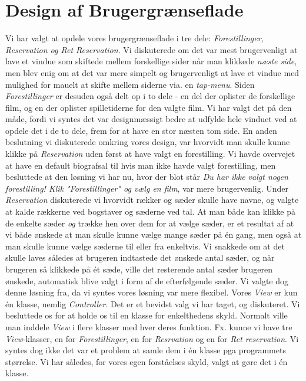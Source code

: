 \documentclass[final]{report}
\begin{document}
\section{Design af Brugergrænseflade}
Vi har valgt at opdele vores brugergrænseflade i tre dele: \emph{Forestillinger, Reservation og Ret Reservation}. Vi diskuterede om det var mest brugervenligt at lave et vindue som skiftede mellem forskellige sider når man klikkede \emph{næste side}, men blev enig om at det var mere simpelt og brugervenligt at lave et vindue med mulighed for mauelt at skifte mellem siderne via. en \emph{tap-menu}. Siden \emph{Forestillinger} er desuden også delt op i to dele - en del der oplister de forskellige film, og en der oplister spilletiderne for den valgte film. Vi har valgt det på den måde, fordi vi syntes det var designmæssigt bedre at udfylde hele vinduet ved at opdele det i de to dele, frem for at have en stor næsten tom side. 
En anden beslutning vi diskuterede omkring vores design, var hvorvidt man skulle kunne klikke på \emph{Reservation} uden først at have valgt en forestilling. Vi havde overvejet at have en default biografsal til hvis man ikke havde valgt forestilling, men besluttede at den løsning vi har nu, hvor der blot står \emph{Du har ikke valgt nogen forestilling! Klik "Forestillinger" og vælg en film}, var mere brugervenlig. 
Under \emph{Reservation} diskuterede vi hvorvidt rækker og sæder skulle have navne, og valgte at kalde rækkerne ved bogstaver og sæderne ved tal. At man både kan klikke på de enkelte sæder \emph{og} trække hen over dem for at vælge sæder, er et resultat af at vi både ønskede at man skulle kunne vælge mange sæder på én gang, men også at man skulle kunne vælge sæderne til eller fra enkeltvis. Vi snakkede om at det skulle laves således at brugeren indtastede det ønskede antal sæder, og når brugeren så klikkede på ét sæde, ville det resterende antal sæder brugeren ønskede, automatisk blive valgt i form af de efterfølgende sæder. Vi valgte dog denne løsning fra, da vi syntes vores løsning var mere flexibel. 
Vores \emph{View} er kun én klasse, nemlig \emph{Controller}. Det er et bevidst valg vi har taget, og diskuteret. Vi besluttede os for at holde os til en klasse for enkelthedens skyld. Normalt ville man inddele \emph{View} i flere klasser med hver deres funktion. Fx. kunne vi have tre \emph{View}-klasser, en for \emph{Forestillinger}, en for \emph{Resrvation} og en for \emph{Ret reservation}. Vi syntes dog ikke det var et problem at samle dem i én klasse pga programmets størrelse. Vi har således, for vores egen forståelses skyld, valgt at gøre det i én klasse.
\end{document}

